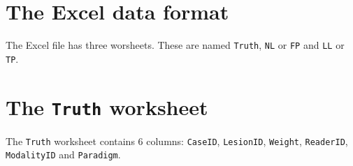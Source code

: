 \documentclass[
]{book}
\begin{document}
\hypertarget{frocExceldataformat}{%
\section{The Excel data format}\label{frocExceldataformat}}

The Excel file has three worsheets. These are named \texttt{Truth}, \texttt{NL} or \texttt{FP} and \texttt{LL} or \texttt{TP}.

\hypertarget{frocExcelTruthdataformat}{%
\section{\texorpdfstring{The \texttt{Truth} worksheet}{The Truth worksheet}}\label{frocExcelTruthdataformat}}

The \texttt{Truth} worksheet contains 6 columns: \texttt{CaseID}, \texttt{LesionID}, \texttt{Weight}, \texttt{ReaderID}, \texttt{ModalityID} and \texttt{Paradigm}.
\end{document}
